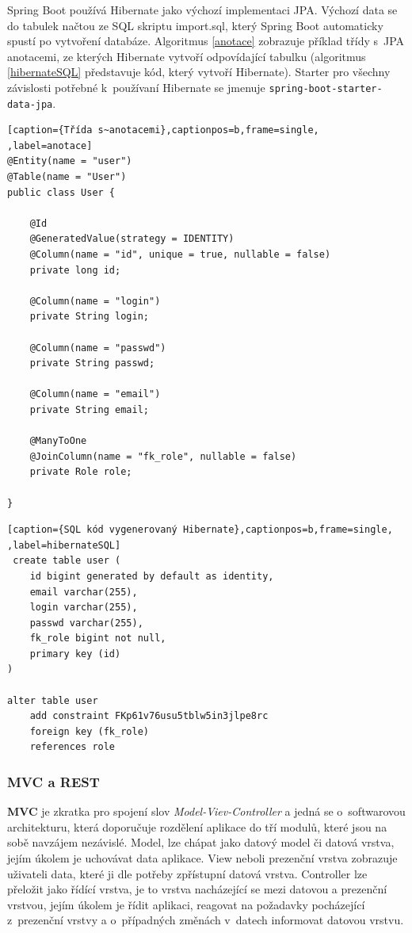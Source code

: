 Spring Boot používá Hibernate jako výchozí implementaci JPA. Výchozí data se do tabulek načtou ze SQL skriptu import.sql, který Spring Boot automaticky spustí po vytvoření databáze. Algoritmus \ref{anotace} zobrazuje příklad třídy s~JPA anotacemi, ze kterých Hibernate vytvoří odpovídající tabulku (algoritmus \ref{hibernateSQL} představuje kód, který vytvoří Hibernate). Starter pro všechny závislosti potřebné k~používaní Hibernate se jmenuje \texttt{spring-boot-starter-\\data-jpa}.



\begin{lstlisting}[caption={Třída s~anotacemi},captionpos=b,frame=single, ,label=anotace]
@Entity(name = "user")
@Table(name = "User")
public class User {

    @Id
    @GeneratedValue(strategy = IDENTITY)
    @Column(name = "id", unique = true, nullable = false)
    private long id;

    @Column(name = "login")
    private String login;

    @Column(name = "passwd")
    private String passwd;

    @Column(name = "email")
    private String email;

    @ManyToOne
    @JoinColumn(name = "fk_role", nullable = false)
    private Role role;

}
\end{lstlisting}

\begin{lstlisting}[caption={SQL kód vygenerovaný Hibernate},captionpos=b,frame=single, ,label=hibernateSQL]
 create table user (
    id bigint generated by default as identity,
    email varchar(255),
    login varchar(255),
    passwd varchar(255),
    fk_role bigint not null,
    primary key (id)
)
    
alter table user 
    add constraint FKp61v76usu5tblw5in3jlpe8rc 
    foreign key (fk_role) 
    references role
\end{lstlisting}

\subsubsection* {MVC a REST}

\textbf{MVC} je zkratka pro spojení slov \textit{Model-Viev-Controller} a jedná se o~softwarovou architekturu, která doporučuje rozdělení aplikace do tří modulů, které jsou na sobě navzájem nezávislé.  Model, lze chápat jako datový model či datová vrstva, jejím úkolem je uchovávat data aplikace. View neboli prezenční vrstva zobrazuje uživateli data, které ji dle potřeby zpřístupní datová vrstva. Controller lze přeložit jako řídící vrstva, je to vrstva nacházející se mezi datovou a prezenční vrstvou, jejím úkolem je řídit aplikaci, reagovat na požadavky pocházející z~prezenční vrstvy a o~případných změnách v~datech informovat datovou vrstvu. 

